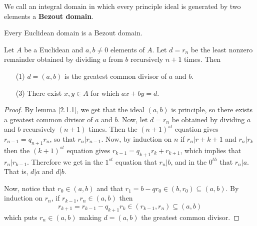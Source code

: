 \begin{definition}
    We call an integral domain in which every principle ideal is generated by
    two elements a \textbf{Bezout domain}.
\end{definition}

\begin{lemma}\label{2.1.5}
    Every Euclidean domain is a Bezout domain.
\end{lemma}

\begin{theorem}\label{2.1.6}
    Let $A$ be a Euclidean and $a,b \neq 0$ elements of  $A$. Let  $d=r_n$ be
    the least nonzero remainder obtained by dividing $a$ from $b$ recursively
    $n+1$ times. Then
    \begin{enumerate}
        \item[(1)] $d=(a,b)$ is the greatest common divisor of $a$ and  $b$.

        \item[(3)] There exist $x,y \in A$ for which  $ax+by=d$.
    \end{enumerate}
\end{theorem}
\begin{proof}
    By lemma \ref{2.1.1}, we get that the ideal $(a,b)$ is principle, so there
    exists a greatest common divisor of $a$ and  $b$. Now, let  $d=r_n$ be
    obtained by dividing $a$ and $b$ recursively $(n+1)$ times. Then the
    $(n+1)^{st}$ equation gives $r_{n-1}=q_{n+1}r_n$, so that $r_n|r_{n-1}$.
    Now, by induction on $n$ if  $r_n|r+{k+1}$ and $r_n|r_k$ then the
    $(k+1)^{st}$ equation gives $r_{k-1}=q_{k+1}r_k+r_{k+1}$, which implies that
    $r_n|r_{k-1}$. Therefore we get in the $1^{st}$ equation that $r_n|b$, and in
    the $0^{th}$ that $r_n|a$. That is,  $d|a$ and  $d|b$.

    Now, notice that $r_0 \in (a,b)$ and that $r_1=b-qr_0 \in (b,r_0) \subseteq
    (a,b)$. By induction on $r_n$, if  $r_{k-1},r_n \in (a,b)$ then
    \begin{equation*}
        r_{k+1}=r_{k-1}-q_{k+1}r_k \in (r_{k-1},r_n) \subseteq (a,b)
    \end{equation*}
    which puts $r_n \in (a,b)$ making $d=(a,b)$ the greatest common divisor.
\end{proof}
